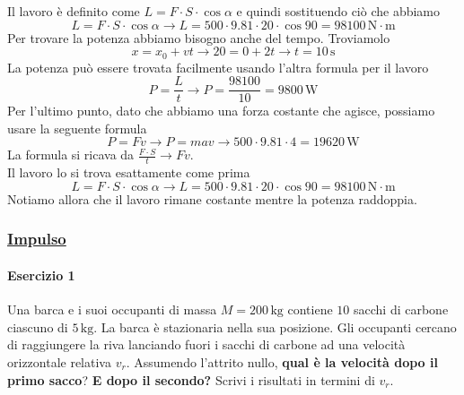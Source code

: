 \divisor

Il lavoro è definito come $L = F\cdot S\cdot \cos\alpha$ e quindi sostituendo ciò che abbiamo
\begin{equation*}
  L = F\cdot S\cdot \cos\alpha \rightarrow L = 500\cdot9.81\cdot20\cdot\cos90 = 
  \boxed{98100\,\text{N}\cdot\text{m}}
\end{equation*}
Per trovare la potenza abbiamo bisogno anche del tempo. Troviamolo
\begin{equation*}
  x = x_0 +vt \rightarrow 20 = 0+2t \rightarrow t = 10\,\text{s}
\end{equation*}
La potenza può essere trovata facilmente usando l'altra formula per il lavoro
\begin{equation*}
  P = \frac{L}{t} \rightarrow P = \frac{98100}{10} = \boxed{9800\,\text{W}}
\end{equation*}
Per l'ultimo punto, dato che abbiamo una forza costante che agisce, possiamo usare la seguente formula
\begin{equation*}
  P = Fv \rightarrow P = mav\rightarrow 500\cdot9.81\cdot4 = \boxed{19620\,\text{W}}
\end{equation*}
La formula si ricava da $\frac{F\cdot S}{t}\rightarrow Fv$.\\
Il lavoro lo si trova esattamente come prima
\begin{equation*}
  L = F\cdot S\cdot \cos\alpha \rightarrow L = 500\cdot9.81\cdot20\cdot\cos90 = 
  \boxed{98100\,\text{N}\cdot\text{m}}
\end{equation*}
Notiamo allora che il lavoro rimane costante mentre la potenza raddoppia.

\subsubsection*{\hyperref[subsec:dinamica:impulso]{Impulso}}\label{ex:impulso}
\paragraph{Esercizio 1}
Una barca e i suoi occupanti di massa $M = 200\,\text{kg}$ contiene $10$ sacchi di carbone ciascuno di
$5\,\text{kg}$. La barca è stazionaria nella sua posizione. Gli occupanti cercano di raggiungere la
riva lanciando fuori i sacchi di carbone ad una velocità orizzontale relativa $v_r$. Assumendo 
l'attrito nullo, \textbf{qual è la velocità dopo il primo sacco}? \textbf{E dopo il secondo?} Scrivi
i risultati in termini di $v_r$.
\divisor

